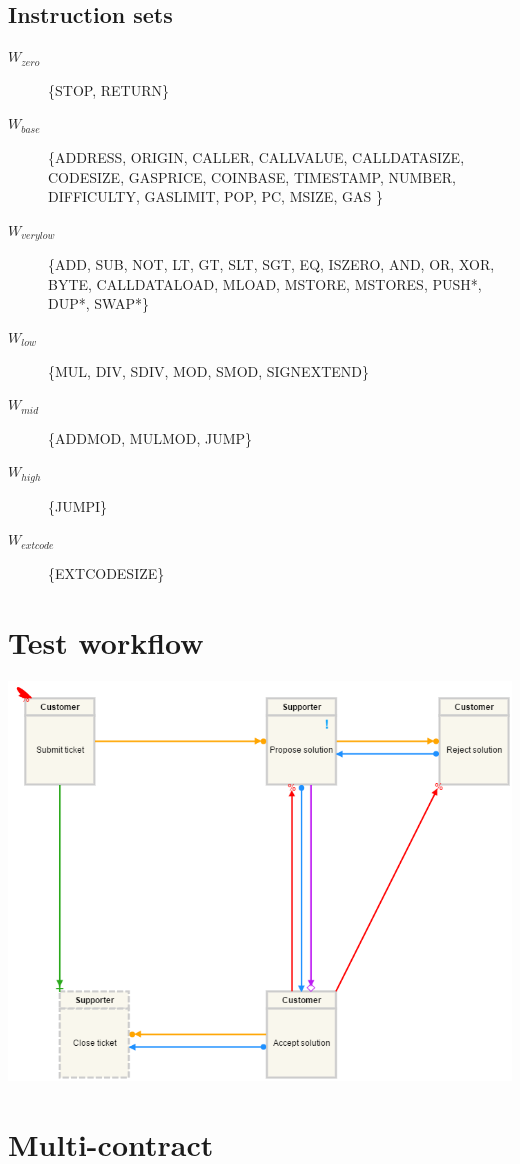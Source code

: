 \documentclass{article}
\begin{document}
		\subsection{Instruction sets}
		\begin{description}
			\item[$W_{zero}$] \{STOP, RETURN\}
			\item[$W_{base}$] \{ADDRESS, ORIGIN, CALLER, CALLVALUE, CALLDATASIZE, CODESIZE, GASPRICE, COINBASE, TIMESTAMP, NUMBER, DIFFICULTY, GASLIMIT, POP, PC, MSIZE, GAS \}
			\item[$W_{verylow}$] \{ADD, SUB, NOT, LT, GT, SLT, SGT, EQ, ISZERO, AND, OR, XOR, BYTE, CALLDATALOAD, MLOAD, MSTORE, MSTORES, PUSH*, DUP*, SWAP*\}
			\item[$W_{low}$] \{MUL, DIV, SDIV, MOD, SMOD, SIGNEXTEND\}
			\item[$W_{mid}$] \{ADDMOD, MULMOD, JUMP\}
			\item[$W_{high}$] \{JUMPI\}
			\item[$W_{extcode}$] \{EXTCODESIZE\}			
		\end{description}

	\section{Test workflow}

		\includegraphics[scale=0.45]{figures/ExampleWorkflow.png}

	\section{Multi-contract}
\end{document}
